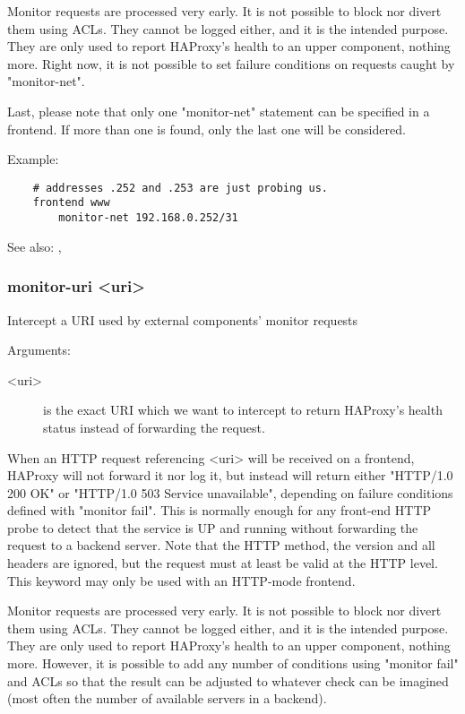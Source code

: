   Monitor requests are processed very early. It is not possible to block nor
  divert them using ACLs. They cannot be logged either, and it is the intended
  purpose. They are only used to report HAProxy's health to an upper component,
  nothing more. Right now, it is not possible to set failure conditions on
  requests caught by "monitor-net".

  Last, please note that only one "monitor-net" statement can be specified in
  a frontend. If more than one is found, only the last one will be considered.

  Example:
\begin{verbatim}
    # addresses .252 and .253 are just probing us.
    frontend www
        monitor-net 192.168.0.252/31
\end{verbatim}

  See also: , 

\subsubsection[monitor-uri]{monitor-uri <uri>}
  Intercept a URI used by external components' monitor requests


  Arguments:
\begin{description}
\item[<uri>]     is the exact URI which we want to intercept to return HAProxy's
              health status instead of forwarding the request.
\end{description}

  When an HTTP request referencing <uri> will be received on a frontend,
  HAProxy will not forward it nor log it, but instead will return either
  "HTTP/1.0 200 OK" or "HTTP/1.0 503 Service unavailable", depending on failure
  conditions defined with "monitor fail". This is normally enough for any
  front-end HTTP probe to detect that the service is UP and running without
  forwarding the request to a backend server. Note that the HTTP method, the
  version and all headers are ignored, but the request must at least be valid
  at the HTTP level. This keyword may only be used with an HTTP-mode frontend.

  Monitor requests are processed very early. It is not possible to block nor
  divert them using ACLs. They cannot be logged either, and it is the intended
  purpose. They are only used to report HAProxy's health to an upper component,
  nothing more. However, it is possible to add any number of conditions using
  "monitor fail" and ACLs so that the result can be adjusted to whatever check
  can be imagined (most often the number of available servers in a backend).

